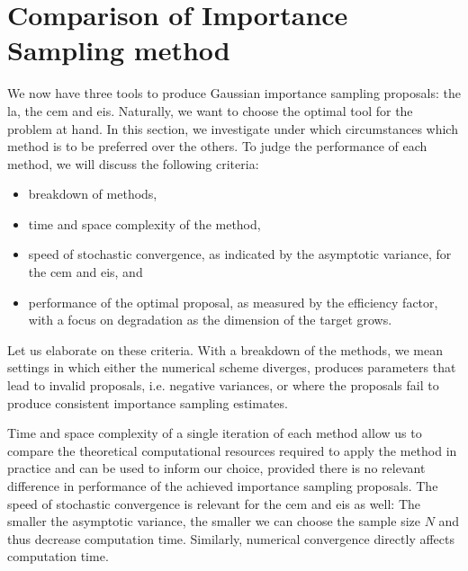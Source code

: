 \section{Comparison of Importance Sampling method}
\label{sec:simulation_studies}

We now have three tools to produce Gaussian importance sampling proposals: the \gls{la}, the \gls{cem} and \gls{eis}. Naturally, we want to choose the optimal tool for the problem at hand. In this section, we investigate under which circumstances which method is to be preferred over the others. To judge the performance of each method, we will discuss the following criteria:
\begin{itemize}
    \item breakdown of methods,
    \item time and space complexity of the method,
    \item speed of stochastic convergence, as indicated by the asymptotic variance, for the \gls{cem} and \gls{eis}, and
    \item performance of the optimal proposal, as measured by the efficiency factor, with a focus on degradation as the dimension of the target grows.
\end{itemize}

Let us elaborate on these criteria. With a breakdown of the methods, we mean settings in which either the numerical scheme diverges, produces parameters that lead to invalid proposals, i.e. negative variances, or where the proposals fail to produce consistent importance sampling estimates. 

Time and space complexity of a single iteration of each method allow us to compare the theoretical computational resources required to apply the method in practice and can be used to inform our choice, provided there is no relevant difference in performance of the achieved importance sampling proposals.
The speed of stochastic convergence is relevant for the \acrshort{cem} and \acrshort{eis} as well: The smaller the asymptotic variance, the smaller we can choose the sample size $N$ and thus decrease computation time. 
Similarly, numerical convergence directly affects computation time. 

